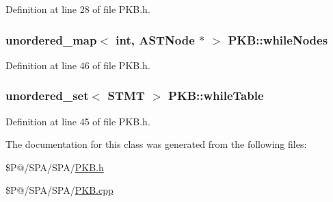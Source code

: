 Definition at line 28 of file P\-K\-B.\-h.

\hypertarget{class_p_k_b_a4be6809486f222460f02b45261602dc7}{
\subsubsection[{while\-Nodes}]{\setlength{\rightskip}{0pt plus 5cm}unordered\-\_\-map$<$ int, {\bf A\-S\-T\-Node} $\ast$ $>$ P\-K\-B\-::while\-Nodes\hspace{0.3cm}{\ttfamily [static]}}}\label{class_p_k_b_a4be6809486f222460f02b45261602dc7}


Definition at line 46 of file P\-K\-B.\-h.

\hypertarget{class_p_k_b_ac2d6057e757e3f104e38866f8b6a16e9}{
\subsubsection[{while\-Table}]{\setlength{\rightskip}{0pt plus 5cm}unordered\-\_\-set$<$ {\bf S\-T\-M\-T} $>$ P\-K\-B\-::while\-Table\hspace{0.3cm}{\ttfamily [static]}}}\label{class_p_k_b_ac2d6057e757e3f104e38866f8b6a16e9}


Definition at line 45 of file P\-K\-B.\-h.



The documentation for this class was generated from the following files\-:\begin{DoxyCompactItemize}
\item 
\$\-P@/\-S\-P\-A/\-S\-P\-A/\hyperlink{_p_k_b_8h}{P\-K\-B.\-h}\item 
\$\-P@/\-S\-P\-A/\-S\-P\-A/\hyperlink{_p_k_b_8cpp}{P\-K\-B.\-cpp}\end{DoxyCompactItemize}
